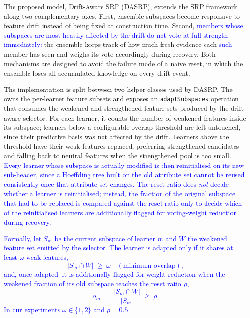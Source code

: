 \documentclass[12pt]{article}
\newcommand{\new}[1]{\textcolor{blue}{#1}}
\begin{document}
The proposed model, Drift-Aware SRP (DASRP), extends the SRP framework along
two complementary axes. First, ensemble subspaces become responsive to
feature drift instead of being fixed at construction time. Second, \new{members
whose subspaces are most heavily affected by the drift do not vote at full
strength immediately:} the ensemble keeps track of how much fresh evidence each
\new{such} member has seen and weighs its vote accordingly during recovery.
Both mechanisms are designed to
avoid the failure mode of a naive reset, in which the ensemble loses all
accumulated knowledge on every drift event.

The implementation is split between two helper classes used by DASRP. The
 owns the per-learner feature subsets and exposes an
\texttt{adaptSubspaces} operation that consumes the weakened and strengthened
feature sets produced by the drift-aware selector. For each learner, it
counts the number of weakened features inside its subspace; learners below a
configurable overlap threshold are left untouched, since their predictive
basis was not affected by the drift. Learners above the threshold have their
weak features replaced, preferring strengthened candidates and falling back
to neutral features when the strengthened pool is too small. \new{Every learner
whose subspace is actually modified is then reinitialised on its new
sub-header, since a Hoeffding tree built on the old attribute set cannot be
reused consistently once that attribute set changes. The reset ratio does
\emph{not} decide whether a learner is reinitialised; instead, the fraction of
the original subspace that had to be replaced is compared against the reset
ratio only to decide which of the reinitialised learners are additionally
flagged for voting-weight reduction during recovery.}

\new{Formally, let $S_m$ be the current subspace of learner $m$ and $W$ the
weakened feature set emitted by the selector. The learner is adapted only if it
shares at least $\omega$ weak features,
\[
|S_m \cap W| \;\geq\; \omega \quad (\text{minimum overlap}),
\]
and, once adapted, it is additionally flagged for weight reduction when the
weakened fraction of its old subspace reaches the reset ratio $\rho$,
\[
o_m \;=\; \frac{|S_m \cap W|}{|S_m|} \;\geq\; \rho .
\]
In our experiments $\omega \in \{1,2\}$ and $\rho = 0.5$.}
\end{document}
